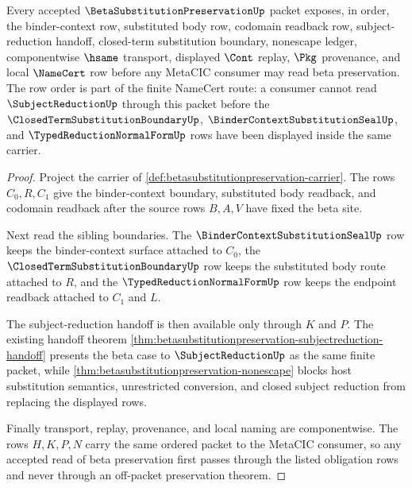 \begin{theorem}
\label{thm:beta-substitution-preservation-obligation-rows}
Every accepted $\BetaSubstitutionPreservationUp$ packet exposes, in order, the binder-context row, substituted body row, codomain readback row, subject-reduction handoff, closed-term substitution boundary, nonescape ledger, componentwise $\hsame$ transport, displayed $\Cont$ replay, $\Pkg$ provenance, and local $\NameCert$ row before any MetaCIC consumer may read beta preservation. The row order is part of the finite NameCert route: a consumer cannot read $\SubjectReductionUp$ through this packet before the $\ClosedTermSubstitutionBoundaryUp$, $\BinderContextSubstitutionSealUp$, and $\TypedReductionNormalFormUp$ rows have been displayed inside the same carrier.
\end{theorem}
\begin{proof}
Project the carrier of \autoref{def:betasubstitutionpreservation-carrier}. The rows $C_0,R,C_1$ give the binder-context boundary, substituted body readback, and codomain readback after the source rows $B,A,V$ have fixed the beta site.

Next read the sibling boundaries. The $\BinderContextSubstitutionSealUp$ row keeps the binder-context surface attached to $C_0$, the $\ClosedTermSubstitutionBoundaryUp$ row keeps the substituted body route attached to $R$, and the $\TypedReductionNormalFormUp$ row keeps the endpoint readback attached to $C_1$ and $L$.

The subject-reduction handoff is then available only through $K$ and $P$. The existing handoff theorem \autoref{thm:betasubstitutionpreservation-subjectreduction-handoff} presents the beta case to $\SubjectReductionUp$ as the same finite packet, while \autoref{thm:betasubstitutionpreservation-nonescape} blocks host substitution semantics, unrestricted conversion, and closed subject reduction from replacing the displayed rows.

Finally transport, replay, provenance, and local naming are componentwise. The rows $H,K,P,N$ carry the same ordered packet to the MetaCIC consumer, so any accepted read of beta preservation first passes through the listed obligation rows and never through an off-packet preservation theorem.
\end{proof}

